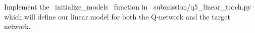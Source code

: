 \item {}
Implement the ~initialize_models~ function in ~submission/q5_linear_torch.py~ which will define our linear model for both the Q-network and the target network.